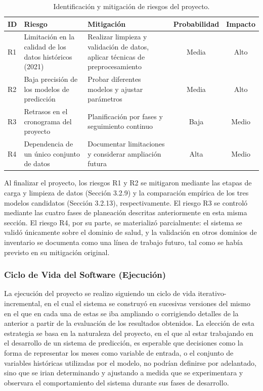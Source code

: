 \begin{table}[H]
    \centering
    \caption{Identificación y mitigación de riesgos del proyecto.}
    \label{tab:riesgos}
    \renewcommand{\arraystretch}{1.3}
    \begin{tabularx}{\textwidth}{|l|X|X|c|c|}
    \hline
    \textbf{ID} & \textbf{Riesgo} & \textbf{Mitigación} & \textbf{Probabilidad} & \textbf{Impacto} \\
    \hline
    R1 & Limitación en la calidad de los datos históricos (2021) & Realizar limpieza y validación de datos, aplicar técnicas de preprocesamiento & Media & Alto \\
    \hline
    R2 & Baja precisión de los modelos de predicción & Probar diferentes modelos y ajustar parámetros & Media & Alto \\
    \hline
    R3 & Retrasos en el cronograma del proyecto & Planificación por fases y seguimiento continuo & Baja & Medio \\
    \hline
    R4 & Dependencia de un único conjunto de datos & Documentar limitaciones y considerar ampliación futura & Alta & Medio \\
    \hline
    \end{tabularx}
\end{table}

Al finalizar el proyecto, los riesgos R1 y R2 se mitigaron mediante las etapas de carga y limpieza de datos (Sección 3.2.9) y la comparación empírica de los tres modelos candidatos (Sección 3.2.13), respectivamente. El riesgo R3 se controló mediante las cuatro fases de planeación descritas anteriormente en esta misma sección. El riesgo R4, por su parte, se materializó parcialmente: el sistema se validó únicamente sobre el dominio de salud, y la validación en otros dominios de inventario se documenta como una línea de trabajo futuro, tal como se había previsto en su mitigación original.


\subsubsection{Ciclo de Vida del Software (Ejecución)}
La ejecución del proyecto se realizo siguiendo un ciclo de vida iterativo-incremental, en el cual el sistema se construyó en sucesivas versiones del mismo en el que en cada una de estas se iba ampliando o corrigiendo detalles de la anterior a partir de la evaluación de los resultados obtenidos. La elección de esta estrategia se basa en la naturaleza del proyecto, en el que al estar trabajando en el desarrollo de un sistema de predicción, es esperable que decisiones como la forma de representar los meses como variable de entrada, o el conjunto de variables históricas utilizadas por el modelo, no podrían definirse por adelantado, sino que se irian determinando y ajustando a medida que se experimentara y observara el comportamiento del sistema durante sus fases de desarrollo.

